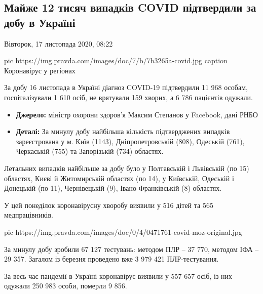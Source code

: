  
 
 

\subsection{Майже 12 тисяч випадків COVID підтвердили за добу в Україні}

Вівторок, 17 листопада 2020, 08:22

\ifcmt
pic https://img.pravda.com/images/doc/7/b/7b3265a-covid.jpg
caption Коронавірус у регіонах
\fi

За добу 16 листопада в Україні діагноз COVID-19 підтвердили 11 968 особам,
госпіталізували 1 610 осіб, не врятували 159 хворих, а 6 786 пацієнтів одужали. 

\begin{itemize}
	
\item \textbf{Джерело:} міністр охорони здоров'я Максим Степанов у Facebook, дані РНБО

\item \textbf{Деталі:} За минулу добу найбільша кількість підтверджених випадків зареєстрована
у м. Київ (1143), Дніпропетровській (808), Одеській (761), Черкаській (755) та
Запорізькій (734) областях.
\end{itemize}

Летальних випадків найбільше за добу було у Полтавській і Львівській (по 15)
областях, Києві й Житомирській областях (по 14), у Київській, Одеській і
Донецькій (по 11), Чернівецькій (9), Івано-Франківській (8)  областях.

У цей понеділок коронавірусну хворобу виявили у 516 дітей та 565
медпрацівників.

\ifcmt
pic https://img.pravda.com/images/doc/0/4/0471761-covid-moz-original.jpg
\fi

За минулу добу зробили 67 127 тестувань: методом ПЛР – 37 770, методом ІФА – 29
357. Загалом із березня проведено вже 3 979 421 ПЛР-тестування. 

За весь час пандемії в Україні коронавірус виявили у 557 657 осіб, із них
одужали 250 983 особи, померли 9 856.

